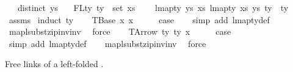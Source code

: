 \begin{isabellebody}
\ \ \ {\isachardoublequoteopen}distinct\ ys{\isachardoublequoteclose}\isanewline
\ \ \ {\isachardoublequoteopen}FLty\ ty\ {\isasymsubseteq}\ set\ xs{\isachardoublequoteclose}\isanewline
\ \ \ \ {\isachardoublequoteopen}lmap{\isacharunderscore}{\kern0pt}ty\ ys\ xs\ {\isacharparenleft}{\kern0pt}lmap{\isacharunderscore}{\kern0pt}ty\ xs\ ys\ ty{\isacharparenright}{\kern0pt}\ {\isacharequal}{\kern0pt}\ ty{\isachardoublequoteclose}\isanewline
%
\isadelimproof
%
\endisadelimproof
%
\isatagproof
{}\isamarkupfalse%
\ assms\isanewline
{}\isamarkupfalse%
\ {\isacharparenleft}{\kern0pt}induct\ ty{\isacharparenright}{\kern0pt}\isanewline
\ \ \isamarkupfalse%
\ {\isacharparenleft}{\kern0pt}TBase\ x{}\ x{}{\isacharparenright}{\kern0pt}\isanewline
\ \ \isamarkupfalse%
\ \isamarkupfalse%
\ {\isacharquery}{\kern0pt}case\isanewline
\ \ \isamarkupfalse%
\ {\isacharparenleft}{\kern0pt}simp\ add{\isacharcolon}{\kern0pt}\ lmap{\isacharunderscore}{\kern0pt}ty{\isacharunderscore}{\kern0pt}def{\isacharparenright}{\kern0pt}\isanewline
\ \ \isamarkupfalse%
\ map{\isacharunderscore}{\kern0pt}lsubst{\isacharunderscore}{\kern0pt}zip{\isacharunderscore}{\kern0pt}inv{\isacharunderscore}{\kern0pt}inv\ \isamarkupfalse%
\ force\isanewline
{}\isamarkupfalse%
\isanewline
\ \ \isamarkupfalse%
\ {\isacharparenleft}{\kern0pt}TArrow\ ty{}\ ty{}\ x{}{\isacharparenright}{\kern0pt}\isanewline
\ \ \isamarkupfalse%
\ \isamarkupfalse%
\ {\isacharquery}{\kern0pt}case\isanewline
\ \ \isamarkupfalse%
\ {\isacharparenleft}{\kern0pt}simp\ add{\isacharcolon}{\kern0pt}\ lmap{\isacharunderscore}{\kern0pt}ty{\isacharunderscore}{\kern0pt}def{\isacharparenright}{\kern0pt}\isanewline
\ \ \isamarkupfalse%
\ map{\isacharunderscore}{\kern0pt}lsubst{\isacharunderscore}{\kern0pt}zip{\isacharunderscore}{\kern0pt}inv{\isacharunderscore}{\kern0pt}inv\ \isamarkupfalse%
\ force\isanewline
{}\isamarkupfalse%
%
\endisatagproof
{\isafoldproof}%
%
\isadelimproof
%
\endisadelimproof
%
\begin{isamarkuptext}%
Free links of a left-folded .%
\end{isamarkuptext}\isamarkuptrue%
\isamarkupfalse%

\end{isabellebody}
